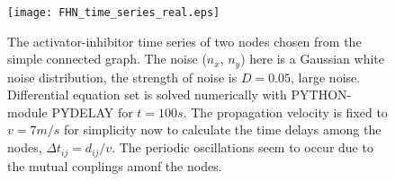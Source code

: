 \documentclass[12pt]{article}
\begin{document}
\begin{figure}[h!]
	\centering
	\texttt{[image: FHN\_time\_series\_real.eps]}
		\caption{The activator-inhibitor time series of two nodes chosen from the simple connected graph. The noise ($n_x$, $n_y$) here is a Gaussian white noise distribution, the strength of noise is $D=0.05$, large noise. Differential equation set is solved numerically with PYTHON-module PYDELAY for $t=100s$. The propagation velocity is fixed to $v=7m/s$ for simplicity now to calculate the time delays among the nodes, $\Delta t_{ij} = d_{ij} /v$. The periodic oscillations seem to occur due to the mutual couplings amonf the nodes.}
\end{figure}
%
%
%
%
%
%
%
%
%
\end{document}
